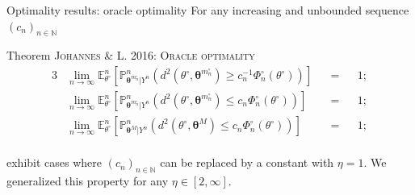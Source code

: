 \documentclass[10pt]{beamer}
\DeclareMathOperator*{\argmin}{arg\,min}
\begin{document}
\begin{frame}{Optimality results: oracle optimality}
For any increasing and unbounded sequence $(c_{n})_{n \in \mathbb{N}}$
\begin{block}{Theorem \textsc{Johannes \& L. 2016: Oracle optimality}}
\begin{alignat*}{3}
& \lim\limits_{n \rightarrow \infty} \mathbb{E}_{\theta^{\circ}}^{n}\left[\mathbb{P}_{\boldsymbol{\theta}^{m_{n}^{\circ}}\vert Y^{n}}^{n}\left(d^{2}\left(\theta^{\circ}, \boldsymbol{\theta}^{m_{n}^{\circ}}\right) \geq c_{n}^{-1} \Phi_{n}^{\circ}(\theta^{\circ}) \right)\right] &&=&& 1;\\
& \lim\limits_{n \rightarrow \infty} \mathbb{E}_{\theta^{\circ}}^{n}\left[\mathbb{P}_{\boldsymbol{\theta}^{m_{n}^{\circ}}\vert Y^{n}}^{n}\left(d^{2}\left(\theta^{\circ}, \boldsymbol{\theta}^{m_{n}^{\circ}}\right) \leq c_{n} \Phi_{n}^{\circ}(\theta^{\circ}) \right)\right] &&=&& 1;\\
& \lim\limits_{n \rightarrow \infty} \mathbb{E}_{\theta^{\circ}}^{n}\left[\mathbb{P}_{\boldsymbol{\theta}^{M} \vert Y^{n}}^{n}\left(d^{2}\left(\theta^{\circ}, \boldsymbol{\theta}^{M}\right) \leq c_{n} \Phi_{n}^{\circ}(\theta^{\circ}) \right)\right] &&=&& 1;\\
\end{alignat*}
\end{block}

\bigskip
\bigskip
\textsc{\citet{JJASRS}} exhibit cases where $(c_{n})_{n \in \mathbb{N}}$ can be replaced by a constant with $\eta = 1$.
We generalized this property for any $\eta \in [2, \infty]$.
\end{frame}
\end{document}
